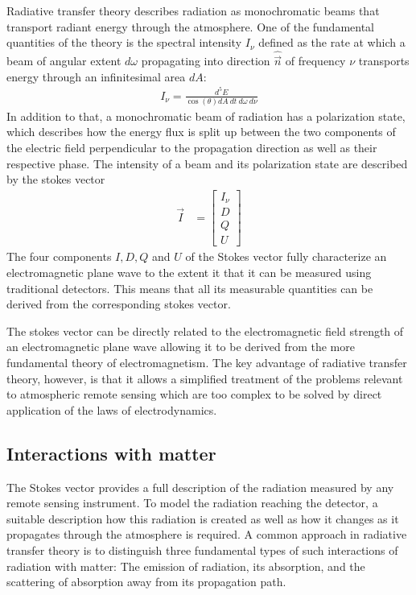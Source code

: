 Radiative transfer theory describes radiation as monochromatic beams that
transport radiant energy through the atmosphere. One of the fundamental
quantities of the theory is the spectral intensity $I_\nu$ defined as the rate
at which a beam of angular extent $d\omega$ propagating into direction
$\hat{\vec{n}}$ of frequency $\nu$ transports energy through an infinitesimal
area $dA$:
\begin{align}\label{eq:spectral_intensity}
  I_\nu = \frac{d^5E}{\cos(\theta) dA\ dt\ d\omega\ d\nu}
\end{align}
In addition to that, a monochromatic beam of radiation has a polarization state,
which describes how the energy flux is split up between the two components of
the electric field perpendicular to the propagation direction as well as their
respective phase. The intensity of a beam and its polarization state are
described by the stokes vector
\begin{align}
  \vec{I} &= \left [ \begin{array}{c}I_\nu \\ D \\ Q \\ U\end{array} \right ]
\end{align}
The four components $I, D, Q$ and $U$ of the Stokes vector fully characterize an
electromagnetic plane wave to the extent it that it can be measured using
traditional detectors. This means that all its measurable quantities can be derived from the
corresponding stokes vector.

The stokes vector can be directly related to the
electromagnetic field strength of an electromagnetic plane wave allowing it to
be derived from the more fundamental theory of electromagnetism. The key
advantage of radiative transfer theory, however, is that it allows a simplified
treatment of the problems relevant to atmospheric remote sensing which are too
complex to be solved by direct application of the laws of electrodynamics.

\subsection{Interactions with matter}

The Stokes vector provides a full description of the radiation measured by any
remote sensing instrument. To model the radiation reaching the detector, a
suitable description how this radiation is created as well as how it changes as
it propagates through the atmosphere is required. A common approach in radiative
transfer theory is to distinguish three fundamental types of such interactions
of radiation with matter: The emission of radiation, its absorption, and the
scattering of absorption away from its propagation path.

